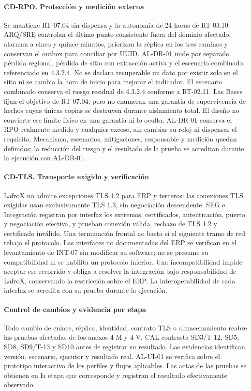 \paragraph*{CD-RPO. Protección y medición externa}
Se mantiene RT-07.04 sin dispensa y la autonomía de 24 horas de RT-03.10. ARQ/SRE controlan el último punto consistente fuera del dominio afectado, alarman a cinco y quince minutos, priorizan la réplica en los tres caminos y conservan el outbox para conciliar por UUID. AL-DR-01 mide por separado pérdida regional, pérdida de sitio con extracción activa y el escenario combinado referenciado en 4.3.2.4. No se declara recuperable un dato por existir solo en el sitio ni se cambia la hora de inicio para mejorar el indicador. El escenario combinado conserva el riesgo residual de 4.3.2.4 conforme a RT-02.11. Las Bases fijan el objetivo de RT-07.04, pero no enumeran una garantía de supervivencia de hechos cuyas únicas copias se destruyen durante aislamiento total. El diseño no convierte ese límite físico en una garantía ni lo oculta. AL-DR-01 conserva el RPO realmente medido y cualquier exceso, sin cambiar su reloj ni dispensar el requisito. Mecanismo, escenarios, mitigaciones, responsable y medición quedan definidos; la reducción del riesgo y el resultado de la prueba se acreditan durante la ejecución con AL-DR-01.

\paragraph*{CD-TLS. Transporte exigido y verificación}
LafroX no admite excepciones TLS 1.2 para ERP y terceros: las conexiones TLS exigidas usan exclusivamente TLS 1.3, sin negociación descendente. SEG e Integración registran por interfaz los extremos, certificados, autenticación, puerto y negociación efectiva, y prueban conexión válida, rechazo de TLS 1.2 y certificado inválido. Una terminación frontal no basta si el siguiente tramo de red rebaja el protocolo. Las interfaces no documentadas del ERP se verifican en el levantamiento de INT-07 sin modificar su software; no se presume su compatibilidad ni se habilita un protocolo inferior. Una incompatibilidad impide aceptar ese recorrido y obliga a resolver la integración bajo responsabilidad de LafroX, conservando la restricción sobre el ERP. La interoperabilidad de cada interfaz se acredita con su prueba durante la ejecución.

\paragraph*{Control de cambios y evidencia por etapa}
Todo cambio de enlace, réplica, identidad, contrato TLS o almacenamiento reabre las pruebas afectadas de los anexos 4-M y 4-V. CAL contrasta SD3/T-12, SD5, SD8, SD9/T-13 y SD10 antes de registrar su resultado. Las evidencias identifican versión, escenario, ejecutor y resultado real. AL-UI-01 se verifica sobre el prototipo interactivo de los perfiles y flujos aplicables. Las actas de las pruebas se obtienen en la etapa que corresponde y registran el resultado efectivamente observado.

\endgroup
